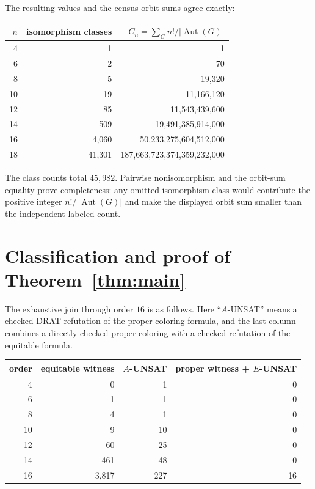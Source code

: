 \documentclass[11pt]{article}
\begin{document}
The resulting values and the census orbit sums agree exactly:
\begin{center}
\begin{tabular}{r@{\qquad}r@{\qquad}r}
\toprule
\(n\) & isomorphism classes & \(C_n=\sum_G n!/|\operatorname{Aut}(G)|\)\\
\midrule
4  & 1      & 1\\
6  & 2      & 70\\
8  & 5      & 19,320\\
10 & 19     & 11,166,120\\
12 & 85     & 11,543,439,600\\
14 & 509    & 19,491,385,914,000\\
16 & 4,060  & 50,233,275,604,512,000\\
18 & 41,301 & 187,663,723,374,359,232,000\\
\bottomrule
\end{tabular}
\end{center}
The class counts total \(45{,}982\).  Pairwise nonisomorphism and the
orbit-sum equality prove completeness: any omitted isomorphism class
would contribute the positive integer \(n!/|\operatorname{Aut}(G)|\) and
make the displayed orbit sum smaller than the independent labeled count.

\section{Classification and proof of Theorem~\ref{thm:main}}

The exhaustive join through order \(16\) is as follows.  Here
``\(A\)-UNSAT'' means a checked DRAT refutation of the proper-coloring
formula, and the last column combines a directly checked proper coloring
with a checked refutation of the equitable formula.

\begin{center}
\begin{tabular}{r@{\qquad}r@{\qquad}r@{\qquad}r}
\toprule
order & equitable witness & \(A\)-UNSAT & proper witness + \(E\)-UNSAT\\
\midrule
4  & 0    & 1   & 0\\
6  & 1    & 1   & 0\\
8  & 4    & 1   & 0\\
10 & 9    & 10  & 0\\
12 & 60   & 25  & 0\\
14 & 461  & 48  & 0\\
16 & 3,817& 227 & 16\\
\bottomrule
\end{tabular}
\end{center}
\end{document}
